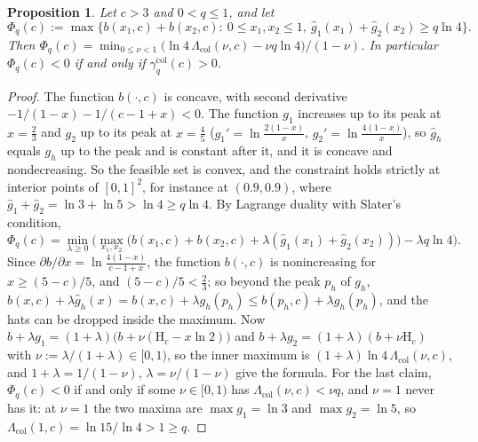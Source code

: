 \documentclass[11pt]{article}
\newtheorem{proposition}[theorem]{Proposition}
\theoremstyle{definition}
\theoremstyle{remark}
\newcommand{\Hh}{\mathrm{H}}
\begin{document}
\begin{proposition}\label{m:prop:colopt}
Let $c>3$ and $0<q\le1$, and let
\[
\Phi_q(c):=\max\big\{b(x_1,c)+b(x_2,c):\ 0\le x_1,x_2\le1,\ \hat g_1(x_1)+\hat g_2(x_2)\ge q\ln4\big\}.
\]
Then $\Phi_q(c)=\min_{0\le\nu<1}\big(\ln4\,\Lambda_{\mathrm{col}}(\nu,c)-\nu q\ln4\big)/(1-\nu)$. In particular $\Phi_q(c)<0$ if and only if $\gamma^{\mathrm{col}}_q(c)>0$.
\end{proposition}

\begin{proof}
The function $b(\cdot,c)$ is concave, with second derivative $-1/(1-x)-1/(c-1+x)<0$. The function $g_1$ increases up to its peak at $x=\frac23$ and $g_2$ up to its peak at $x=\frac45$ ($g_1'=\ln\frac{2(1-x)}x$, $g_2'=\ln\frac{4(1-x)}x$), so $\hat g_h$ equals $g_h$ up to the peak and is constant after it, and it is concave and nondecreasing. So the feasible set is convex, and the constraint holds strictly at interior points of $[0,1]^2$, for instance at $(0.9,0.9)$, where $\hat g_1+\hat g_2=\ln3+\ln5>\ln4\ge q\ln4$. By Lagrange duality with Slater's condition,
\[
\Phi_q(c)=\min_{\lambda\ge0}\Big(\max_{x_1,x_2}\big(b(x_1,c)+b(x_2,c)+\lambda(\hat g_1(x_1)+\hat g_2(x_2))\big)-\lambda q\ln4\Big).
\]
Since $\partial b/\partial x=\ln\frac{4(1-x)}{c-1+x}$, the function $b(\cdot,c)$ is nonincreasing for $x\ge(5-c)/5$, and $(5-c)/5<\frac23$; so beyond the peak $p_h$ of $g_h$, $b(x,c)+\lambda\hat g_h(x)=b(x,c)+\lambda g_h(p_h)\le b(p_h,c)+\lambda g_h(p_h)$, and the hats can be dropped inside the maximum. Now $b+\lambda g_1=(1+\lambda)\big(b+\nu(\Hh_c-x\ln2)\big)$ and $b+\lambda g_2=(1+\lambda)(b+\nu\Hh_c)$ with $\nu:=\lambda/(1+\lambda)\in[0,1)$, so the inner maximum is $(1+\lambda)\ln4\,\Lambda_{\mathrm{col}}(\nu,c)$, and $1+\lambda=1/(1-\nu)$, $\lambda=\nu/(1-\nu)$ give the formula. For the last claim, $\Phi_q(c)<0$ if and only if some $\nu\in[0,1)$ has $\Lambda_{\mathrm{col}}(\nu,c)<\nu q$, and $\nu=1$ never has it: at $\nu=1$ the two maxima are $\max g_1=\ln3$ and $\max g_2=\ln5$, so $\Lambda_{\mathrm{col}}(1,c)=\ln15/\ln4>1\ge q$.
\end{proof}
\end{document}
